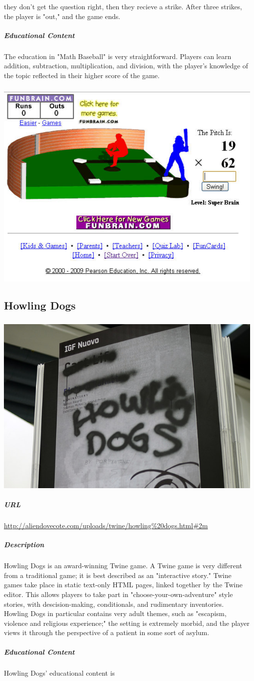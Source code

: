 they don't get the question right, then they recieve a strike. After three strikes, the player is "out," and the game ends.\subparagraph{Educational Content}The education in "Math Baseball" is very straightforward. Players can learn addition, subtraction, multiplication, and division, with the player's knowledge of the topic reflected in their higher score of the game.\subparagraph{}\includegraphics[width = \textwidth]{img/baseball_screen.jpg}\subsection{Howling Dogs}\subparagraph{}\includegraphics[width = \textwidth]{img/dogs_title.jpg}\subparagraph{URL}\url{http://aliendovecote.com/uploads/twine/howling%20dogs.html#2m}\subparagraph{Description}Howling Dogs is an award-winning Twine game. A Twine game is very different from a traditional game; it is best described as an "interactive story." Twine games take place in static text-only HTML pages, linked together by the Twine editor. This allows players to take part in "choose-your-own-adventure" style stories, with descision-making, conditionals, and rudimentary inventories. Howling Dogs in particular contains very adult themes, such as "escapism, violence and religious experience;" the setting is extremely morbid, and the player views it through the perspective of a patient in some sort of asylum.\subparagraph{Educational Content}Howling Dogs' educational content is 